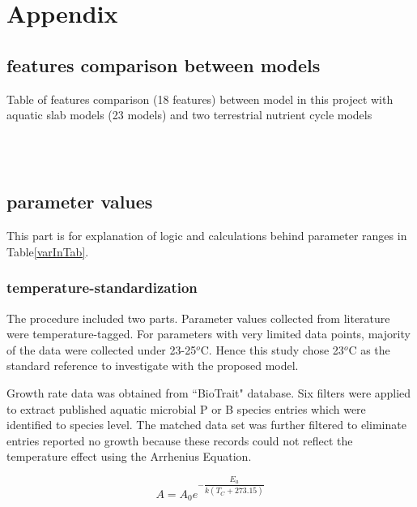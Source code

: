 \documentclass[../thesis.tex]{subfiles} %
\begin{document}
\section{Appendix}
\beginSupp

\subsection{features comparison between models}
\begin{table}[H]
\begin{tiny}
    \centering
    \caption[Model features comparison]{Table of features comparison (18 features) between model in this project with aquatic slab models (23 models) and two terrestrial nutrient cycle models}
    \\
    \vspace{.5cm}
    \\
    \vspace{.5cm}
    \label{modComp}
\end{tiny}
\end{table}

\subsection{parameter values}
This part is for explanation of logic and calculations behind parameter ranges in Table\ref{varInTab}.

\subsubsection{temperature-standardization}
The procedure included two parts.  Parameter values collected from literature were temperature-tagged.  For parameters with very limited data points, majority of the data were collected under 23-25$^o$C.  Hence this study chose 23$^o$C as the standard reference to investigate with the proposed model.

Growth rate data was obtained from ``BioTrait" database\autocite{della2013thermal}.  Six filters were applied to extract published aquatic microbial P or B species entries which were identified to species level.  The matched data set was further filtered to eliminate entries reported no growth because these records could not reflect the temperature effect using the Arrhenius Equation.

\begin{equation}
    A = A_0e^{-\dfrac{E_a}{k(T_C+273.15)}}
    \label{arrEq}
\end{equation}
\end{document}
